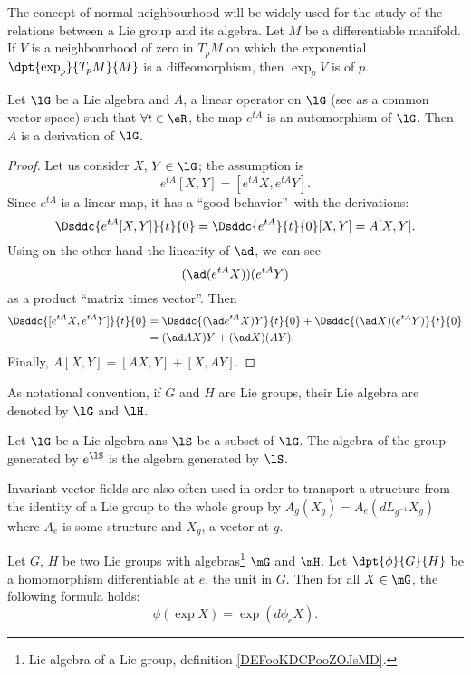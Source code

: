 The concept of normal neighbourhood will be widely used for the study of the relations between a Lie group and its algebra. Let $M$ be a differentiable manifold. If $V$ is a neighbourhood of zero in $T_pM$ on which the exponential $\dpt{\exp_p}{T_pM}{M}$ is a diffeomorphism, then $\exp_pV$ is   of $p$.

\begin{lemma}
Let $\lG$ be a Lie algebra and $A$, a linear operator on $\lG$ (see as a common vector space) such that $\forall t\in\eR$, the map $e^{tA}$ is an automorphism of $\lG$. Then $A$ is a derivation of $\lG$.
\label{lem:autom_derr}
\end{lemma}

\begin{proof}
Let us consider $X$, $Y\in\lG$;  the assumption is
\[
  e^{tA}[X,Y]=[e^{tA}X,e^{tA}Y].
\]
Since $e^{tA}$ is a linear map, it has a ``good behavior''\ with the derivations:
\[
\Dsddc{e^{tA}[X,Y]}{t}{0}=\Dsddc{e^{tA}}{t}{0}[X,Y]=A[X,Y].
\]
Using on the other hand the linearity of $\ad$, we can see
\[
  (\ad(e^{tA}X))(e^{tA}Y)
\]
as a product ``matrix times vector''. Then
\begin{equation}
\begin{split}
  \Dsddc{[e^{tA}X,e^{tA}Y]}{t}{0}&=\Dsddc{(\ad e^{tA}X)Y}{t}{0}+\Dsddc{(\ad X)(e^{tA}Y)}{t}{0}\\
                                 &=(\ad AX)Y+(\ad X)(AY).
\end{split}
\end{equation}
Finally, $A[X,Y]=[AX,Y]+[X,AY]$.

\end{proof}

As notational convention, if $G$ and $H$ are Lie groups, their Lie algebra are denoted by $\lG$ and $\lH$.

\begin{lemma}		\label{LemAlgEtGroupesGenere}
	Let $\lG$ be a Lie algebra ans $\lS$ be a subset of $\lG$. The algebra of the group generated by $ e^{\lS}$ is the algebra generated by $\lS$.
\end{lemma}

Invariant vector fields are also often used in order to transport a structure from the identity of a Lie group to the whole group by $A_g(X_g)=A_e(dL_{g^{-1}}X_g)$ where $A_e$ is some structure and $X_g$, a vector at $g$.


\begin{lemma}		\label{lemsur5d}
    Let $G$, $H$ be two Lie groups with algebras\footnote{Lie algebra of a Lie group, definition \ref{DEFooKDCPooZOJsMD}.} $\mG$ and $\mH$. Let $\dpt{\phi}{G}{H}$ be a homomorphism differentiable at $e$, the unit in $G$. Then for all $X\in\mG$, the following formula holds:
	\[
		\phi(\exp X)=\exp(d\phi_eX).
	\]
\end{lemma}

